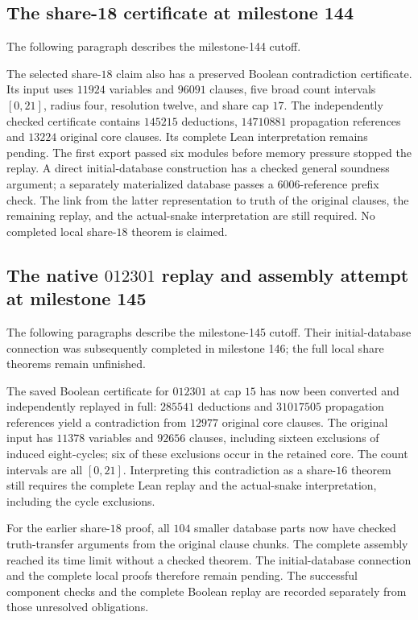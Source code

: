 \documentclass[11pt,a4paper]{article}
\theoremstyle{definition}
\theoremstyle{remark}
\begin{document}
\subsection{The share-18 certificate at milestone 144}
The following paragraph describes the milestone-144 cutoff.

The selected share-$18$ claim also has a preserved Boolean contradiction
certificate. Its input uses $11924$ variables and $96091$ clauses, five
broad count intervals $[0,21]$, radius four, resolution twelve, and share
cap $17$. The independently checked certificate contains $145215$
deductions, $14710881$ propagation references and $13224$ original core
clauses. Its complete Lean interpretation remains pending. The first
export passed six modules before memory pressure stopped the replay.
A direct initial-database construction has a checked general soundness
argument; a separately materialized database passes a $6006$-reference
prefix check. The link from the latter representation to truth of the
original clauses, the remaining replay, and the actual-snake interpretation
are still required. No completed local share-$18$ theorem is claimed.
\subsection{The native $012301$ replay and assembly attempt at milestone 145}
The following paragraphs describe the milestone-145 cutoff. Their
initial-database connection was subsequently completed in milestone 146;
the full local share theorems remain unfinished.

The saved Boolean certificate for $012301$ at cap $15$ has now been
converted and independently replayed in full: $285541$ deductions and
$31017505$ propagation references yield a contradiction from $12977$
original core clauses. The original input has $11378$ variables and
$92656$ clauses, including sixteen exclusions of induced eight-cycles;
six of these exclusions occur in the retained core. The count intervals
are all $[0,21]$. Interpreting this contradiction as a share-$16$ theorem
still requires the complete Lean replay and the actual-snake interpretation,
including the cycle exclusions.

For the earlier share-$18$ proof, all $104$ smaller database parts now
have checked truth-transfer arguments from the original clause chunks.
The complete assembly reached its time limit without a checked theorem.
The initial-database connection and the complete local proofs therefore
remain pending. The successful component checks and the complete Boolean
replay are recorded separately from those unresolved obligations.
\end{document}
